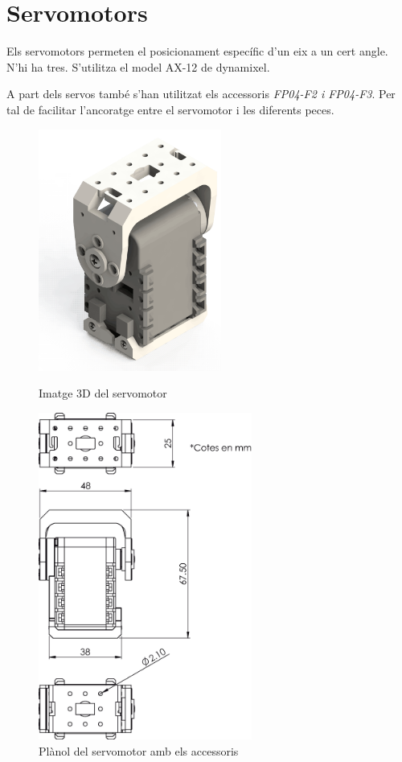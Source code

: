 \documentclass[a4paper, 12pt]{article}
\begin{document}
\newpage
\section{Servomotors}
Els servomotors permeten el posicionament específic d'un eix a un cert angle. N'hi ha tres. S'utilitza el model AX-12 de dynamixel. 

A part dels servos també s'han utilitzat els accessoris \emph{FP04-F2 i FP04-F3}. Per tal de facilitar l'ancoratge entre el servomotor i les diferents peces.

\begin{figure}[h!]
\centering
\begin{minipage}[b]{0.45\linewidth}
\centering
\includegraphics[width=6cm]{./imgComp/servo}
\caption{Imatge 3D del servomotor}
\end{minipage}
\begin{minipage}[b]{0.45\linewidth}
\centering
\includegraphics[width=7cm]{./sketch/servo}
\caption{Plànol del servomotor amb els accessoris}
\end{minipage}
\end{figure}
\end{document}
